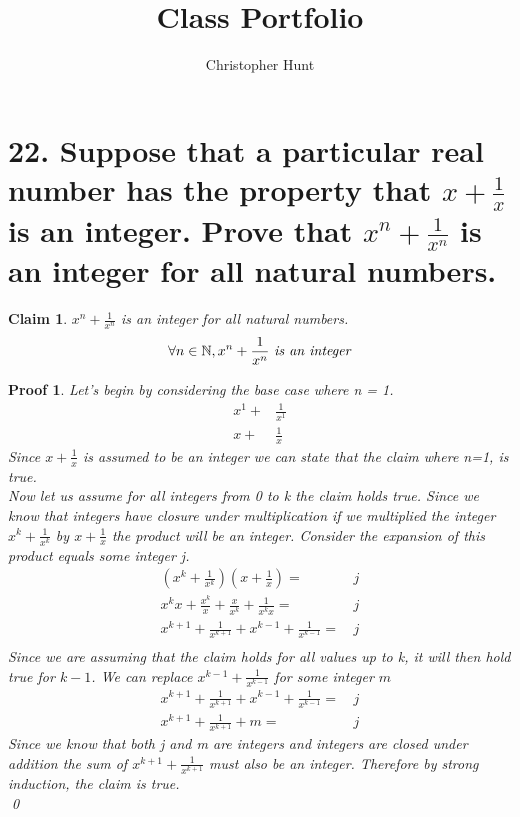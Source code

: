 \documentclass{article}
\title{Class Portfolio}
\author{Christopher Hunt}
\date{}
\newtheorem*{claim}{Claim}
\newtheorem*{poof}{Proof}
\begin{document}
\pagestyle{fancy}
\fancyhf{}
\rhead{\thepage}

\maketitle

\section*{22. Suppose that a particular real number 
 has the property that $x+\frac{1}{x}$ is an integer. Prove that $x^n+\frac{1}{x^n}$ is an integer for all natural numbers.}

\begin{claim}
     $x^n+\frac{1}{x^n}$ is an integer for all natural numbers.
     $$\forall n \in \mathbb{N}, x^n +\frac{1}{x^n}\text{ \emph{is an integer}}$$
\end{claim}
\begin{poof}
     Let's begin by considering the base case where n = 1.
    \begin{align*}
         x^1+&\frac{1}{x^1}\\         x+&\frac{1}{x}
    \end{align*}
    Since $x+\frac{1}{x}$ is assumed to be an integer we can state that the claim where n=1, is true.
    \\
    
    \noindent Now let us assume for all integers from 0 to k the claim holds true. Since we know that integers have closure under multiplication if we multiplied the integer $x^k+\frac{1}{x^k}$ by $x+\frac{1}{x}$ the product will be an integer. Consider the expansion of this product equals some integer j.
    \begin{align*}
        (x^k+\frac{1}{x^k})(x+\frac{1}{x})=&\,j\\
        x^kx+\frac{x^k}{x}+\frac{x}{x^k}+\frac{1}{x^kx}=&\,j\\
        x^{k+1}+\frac{1}{x^{k+1}}+x^{k-1}+\frac{1}{x^{k-1}}=&\,j\\
    \end{align*}
    Since we are assuming that the claim holds for all values up to k, it will then hold true for $k-1$. We can replace $x^{k-1}+\frac{1}{x^{k-1}}$ for some integer $m$
    \begin{align*}
        x^{k+1}+\frac{1}{x^{k+1}}+x^{k-1}+\frac{1}{x^{k-1}}=&\,j\\
        x^{k+1}+\frac{1}{x^{k+1}}+m=&\,j
    \end{align*}
    Since we know that both j and m are integers and integers are closed under addition the sum of $x^{k+1}+\frac{1}{x^{k+1}}$ must also be an integer. Therefore by strong induction, the claim is true.
    \\
    \qed
\end{poof}
\newpage
\end{document}
